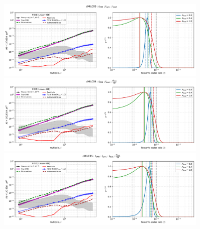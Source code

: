 \documentclass[11pt]{article}
\begin{document}
\begin{figure}
\centering
\includegraphics[width=0.9\textwidth]{ps_and_bbposterir_cMILC03.pdf}
\includegraphics[width=0.9\textwidth]{ps_and_bbposterir_cMILC04.pdf}
\includegraphics[width=0.9\textwidth]{ps_and_bbposterir_cMILC05.pdf}
\end{figure}
\end{document}
